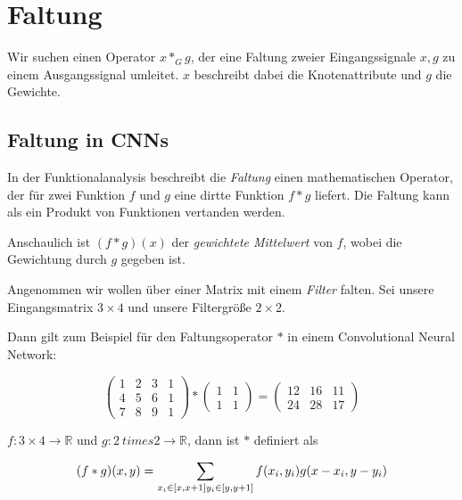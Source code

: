 \section{Faltung}

Wir suchen einen Operator $x *_G g$, der eine Faltung zweier Eingangssignale $x, g$ zu einem Ausgangssignal umleitet.
$x$ beschreibt dabei die Knotenattribute und $g$ die Gewichte.

\subsection{Faltung in CNNs}

In der Funktionalanalysis beschreibt die \emph{Faltung} einen mathematischen Operator, der für zwei Funktion $f$ und $g$ eine dirtte Funktion $f * g$ liefert.
Die Faltung kann als ein Produkt von Funktionen vertanden werden.

Anschaulich ist $(f * g)(x)$ der \emph{gewichtete Mittelwert} von $f$, wobei die Gewichtung durch $g$ gegeben ist.

Angenommen wir wollen über einer Matrix mit einem \emph{Filter} falten.
Sei unsere Eingangsmatrix $3 \times 4$ und unsere Filtergröße $2 \times 2$.

Dann gilt zum Beispiel für den Faltungsoperator $*$ in einem Convolutional Neural Network:

\begin{equation}
  \begin{pmatrix}
    1 & 2 & 3 & 1\\
    4 & 5 & 6 & 1\\
    7 & 8 & 9 & 1
  \end{pmatrix} * \begin{pmatrix}
    1 & 1\\
    1 & 1
  \end{pmatrix} = \begin{pmatrix}
    12 & 16 & 11\\
    24 & 28 & 17
  \end{pmatrix}
\end{equation}

$f: 3 \times 4 \rightarrow \mathbb{R}$ und $g: 2 \ times 2 \rightarrow \mathbb{R}$, dann ist $*$ definiert als

\begin{equation}
  (f * g)(x, y) = \sum_{x_i \in [x, x+1]\\y_i \in [y, y+1]} f(x_i, y_i)g(x-x_i, y-y_i)
\end{equation}

